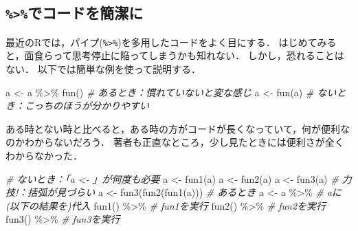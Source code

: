 \documentclass[
]{article}
\newenvironment{Shaded}{\begin{snugshade}}{\end{snugshade}}
\newcommand{\CommentTok}[1]{\textcolor[rgb]{0.56,0.35,0.01}{\textit{#1}}}
\newcommand{\FunctionTok}[1]{\textcolor[rgb]{0.00,0.00,0.00}{#1}}
\newcommand{\NormalTok}[1]{#1}
\newcommand{\OtherTok}[1]{\textcolor[rgb]{0.56,0.35,0.01}{#1}}
\newcommand{\SpecialCharTok}[1]{\textcolor[rgb]{0.00,0.00,0.00}{#1}}
\begin{document}
\hypertarget{ux3067ux30b3ux30fcux30c9ux3092ux7c21ux6f54ux306b}{%
\subsection{\texorpdfstring{\texttt{\%\textgreater{}\%}でコードを簡潔に}{\%\textgreater\%でコードを簡潔に}}\label{ux3067ux30b3ux30fcux30c9ux3092ux7c21ux6f54ux306b}}

最近のRでは，パイプ(\texttt{\%\textgreater{}\%})を多用したコードをよく目にする．
はじめてみると，面食らって思考停止に陥ってしまうかも知れない．
しかし，恐れることはない．
以下では簡単な例を使って説明する．

\begin{Shaded}
\begin{Highlighting}[]
\NormalTok{a }\OtherTok{\textless{}{-}}\NormalTok{ a }\SpecialCharTok{\%\textgreater{}\%} \FunctionTok{fun}\NormalTok{() }\CommentTok{\# あるとき：慣れていないと変な感じ}
\NormalTok{a }\OtherTok{\textless{}{-}} \FunctionTok{fun}\NormalTok{(a)      }\CommentTok{\# ないとき：こっちのほうが分かりやすい}
\end{Highlighting}
\end{Shaded}

ある時とない時と比べると，ある時の方がコードが長くなっていて，何が便利なのかわからないだろう．
著者も正直なところ，少し見たときには便利さが全くわからなかった．

\begin{Shaded}
\begin{Highlighting}[]
  \CommentTok{\# ないとき：「a \textless{}{-} 」が何度も必要}
\NormalTok{a }\OtherTok{\textless{}{-}} \FunctionTok{fun1}\NormalTok{(a)}
\NormalTok{a }\OtherTok{\textless{}{-}} \FunctionTok{fun2}\NormalTok{(a)}
\NormalTok{a }\OtherTok{\textless{}{-}} \FunctionTok{fun3}\NormalTok{(a)}
  \CommentTok{\# 力技!：括弧が見づらい}
\NormalTok{a }\OtherTok{\textless{}{-}} \FunctionTok{fun3}\NormalTok{(}\FunctionTok{fun2}\NormalTok{(}\FunctionTok{fun1}\NormalTok{(a)))}
  \CommentTok{\# あるとき}
\NormalTok{a }\OtherTok{\textless{}{-}}\NormalTok{ a }\SpecialCharTok{\%\textgreater{}\%}   \CommentTok{\# aに(以下の結果を)代入}
  \FunctionTok{fun1}\NormalTok{() }\SpecialCharTok{\%\textgreater{}\%} \CommentTok{\# fun1を実行}
  \FunctionTok{fun2}\NormalTok{() }\SpecialCharTok{\%\textgreater{}\%} \CommentTok{\# fun2を実行}
  \FunctionTok{fun3}\NormalTok{() }\SpecialCharTok{\%\textgreater{}\%} \CommentTok{\# fun3を実行}
\end{Highlighting}
\end{Shaded}
\end{document}
